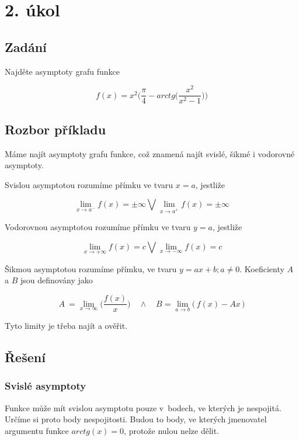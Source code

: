 \section{2. úkol}
\subsection{Zadání}

Najděte asymptoty grafu funkce 

\begin{displaymath}
f(x) = x^2\Big(\frac{\pi}{4}-arctg\Big(\frac{x^2}{x^2-1}\Big)\Big)
\end{displaymath}

\subsection{Rozbor příkladu}

Máme najít asymptoty grafu funkce, což znamená najít svislé, šikmé i vodorovné asymptoty.

Svislou asymptotou rozumíme přímku ve tvaru $x=a$, jestliže 

\begin{displaymath}
\lim_{x \to a^-} f(x) = \pm \infty \bigvee\lim_{x \to a^+} f(x) = \pm \infty
\end{displaymath}

Vodorovnou asymptotou rozumíme přímku ve tvaru $y=a$, jestliže

\begin{displaymath}
\lim_{x \to +\infty} f(x) = c \bigvee\lim_{x \to - \infty} f(x) = c
\end{displaymath}

Šikmou asymptotou rozumíme přímku, ve tvaru $y=ax+b;a \neq 0$. Koeficienty $A$ a $B$ jsou definovány jako

\begin{displaymath}
A~= \lim_{x \rightarrow \infty}\Big( \frac{f(x)}{x}\Big) \quad\wedge\quad B = \lim_{a \rightarrow b}\big(\,f(x)-Ax\,\big)
\end{displaymath}

Tyto limity je třeba najít a ověřit.

\subsection{Řešení}

\subsubsection{Svislé asymptoty}
Funkce může mít svislou asymptotu pouze v~bodech, ve kterých je nespojitá. Určíme si proto body nespojitosti. Budou to body, ve kterých jmenovatel argumentu funkce $arctg(x) = 0$, protože nulou nelze dělit.

